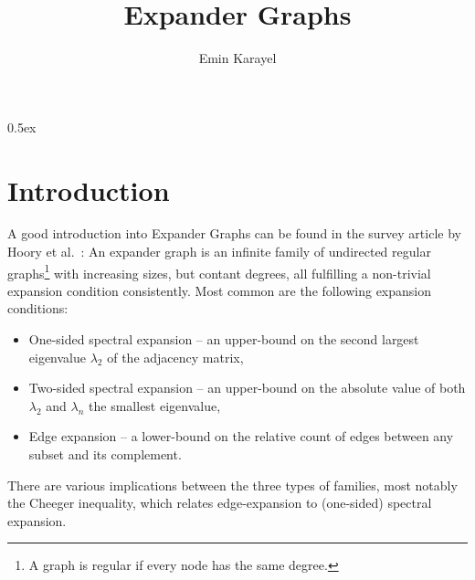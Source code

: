 \documentclass[11pt,a4paper]{article}
\begin{document}
\title{Expander Graphs}
\author{Emin Karayel}
\maketitle


\tableofcontents

\parindent 0pt\parskip 0.5ex

\section{Introduction}
A good introduction into Expander Graphs can be found in the survey article by 
Hoory et al.~\cite{hoory2006}: An expander graph is an infinite family of undirected regular 
graphs\footnote{A graph is regular if every node has the same degree.}  
with increasing sizes, but contant degrees, all fulfilling a non-trivial expansion condition 
consistently. Most common are the following expansion conditions:
\begin{itemize}
\item One-sided spectral expansion -- an upper-bound on the second largest 
  eigenvalue $\lambda_2$ of the adjacency matrix,
\item Two-sided spectral expansion -- an upper-bound on the absolute value of both 
  $\lambda_2$ and $\lambda_n$ the smallest eigenvalue,
\item Edge expansion -- a lower-bound on the relative count of edges between any subset
  and its complement.
\end{itemize}

There are various implications between the three types of families, most notably the Cheeger 
inequality, which relates edge-expansion to (one-sided) spectral expansion.
\end{document}
